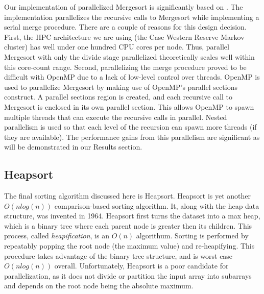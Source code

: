 \documentclass[conference]{IEEEtran}
\begin{document}
    Our implementation of parallelized Mergesort is significantly based on \cite{radenski_mergesort}. The implementation parallelizes the recursive calls to Mergesort while implementing a serial merge procedure. There are a couple of reasons for this design decision. First, the HPC architecture we are using (the Case Western Reserve Markov cluster) has well under one hundred CPU cores per node. Thus, parallel Mergesort with only the divide stage parallelized theoretically scales well within this core-count range. Second, parallelizing the merge procedure proved to be difficult with OpenMP due to a lack of low-level control over threads. OpenMP is used to parallelize Mergesort by making use of OpenMP's parallel sections construct. A parallel sections region is created, and each recursive call to Mergesort is enclosed in its own parallel section. This allows OpenMP to spawn multiple threads that can execute the recursive calls in parallel. Nested parallelism is used so that each level of the recursion can spawn more threads (if they are available). The performance gains from this parallelism are significant as will be demonstrated in our Results section.
    
    
    \subsection{Heapsort}
    The final sorting algorithm discussed here is Heapsort. Heapsort is yet another $O(nlog(n))$ comparison-based sorting algorithm. 
    It, along with the heap data structure, was invented in 1964. \cite{forsythe_algorithms_1964}
    Heapsort first turns the dataset into a max heap, which is a binary tree where each parent node is greater then its children. 
    This process, called \textit{heapification}, is an $O(n)$ algorithum. 
    Sorting is performed by repeatably popping the root node (the maximum value) and re-heapifying. 
    This procedure takes advantage of the binary tree structure, and is worst case $O(n log (n))$ overall.  \cite{cormen_introduction_2009}
    Unfortunately, Heapsort is a poor candidate for parallelization, as it does not divide or partition the input array into subarrays and depends on the root node being the absolute maximum. 
    
\end{document}
